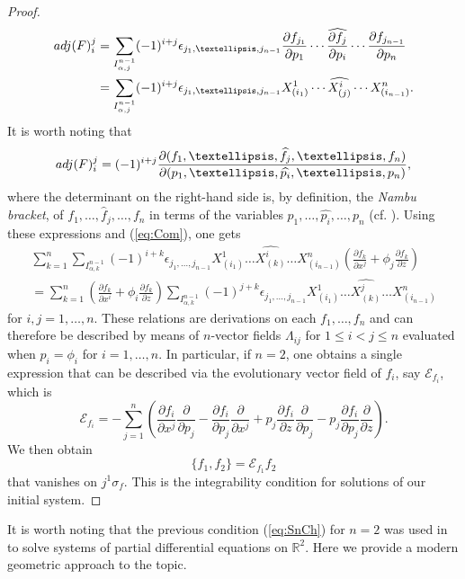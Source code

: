 \documentclass[12pt]{article}
\theoremstyle{plain}
\theoremstyle{definition}
\numberwithin{equation}{section}
\begin{document}
\begin{proof}
\begin{align*}
{\rm adj}(F)_{i}^j&=\sum_{I^{n-1}_{\alpha,j}}(-1)^{i+j}\epsilon_{j_1,\ldots,j_{n-1}}\frac{\partial f_{j_1}}{\partial p_{1}}\cdots\widehat{\frac{\partial f_{j}}{\partial p_{i}}}\cdots \frac{\partial f_{j_{n-1}}}{\partial p_{n}}
\\&=\sum_{I^{n-1}_{\alpha,j}}(-1)^{i+j}\epsilon_{j_1,\ldots,j_{n-1}}X^1_{({i_1})}\cdots\widehat{X^i_{({j})}}\cdots X^n_{(i_{n-1})}.
\end{align*}
It is worth noting that 
$$
{\rm adj}(F)_{i}^j=(-1)^{i+j}\frac{\partial(f_1,\ldots,\widehat{f}_j,\ldots ,f_n)}{\partial (p_1,\ldots,\widehat{p_i},\ldots,p_n)},
$$
where the determinant on the right-hand side is, by definition, the {\it Nambu bracket}, of $f_1,\ldots,\widehat{f}_j,\ldots,f_n$ in terms of the variables $p_1,\ldots,\widehat{p_i},\ldots,p_n$ (cf. \cite{Sh06}). 
Using these expressions and  (\ref{eq:Com}), one gets
\begin{multline*}
\sum_{k=1}^n\sum_{I^{n-1}_{\alpha,k}}(-1)^{i+k}\epsilon_{j_1,\ldots,j_{n-1}}X^{1}_{(i_1)}\ldots \widehat{X^{i}_{(k)}}\ldots X_{(i_{n-1})}^n\left(\frac{\partial f_k}{\partial x^j}+\phi_j\frac{\partial f_k}{\partial z}\right)\\=\sum_{k=1}^n
\left(\frac{\partial f_k}{\partial x^i}+\phi_i\frac{\partial f_k}{\partial z}\right)\sum_{I^{n-1}_{\alpha,k}}(-1)^{j+k}\epsilon_{j_1,\ldots,j_{n-1}}X^{1}_{(i_1)}\ldots \widehat{X^{j}_{(k)}}\ldots X_{(i_{n-1})}^n
\end{multline*}
for $i,j=1,\ldots,n$. These relations are derivations on each $f_1,\ldots,f_n$ and can therefore be described by means of  $n$-vector fields $\Lambda_{ij}$ for $1\leq i<j\leq n$ evaluated when $p_i=\phi_i$ for $i=1,\ldots,n$. In particular, if $n=2$, one obtains a single expression that can be described via the evolutionary vector field of $f_i$,  say $\mathcal{E}_{f_i}$, which is
$$
\mathcal{E}_{f_i}=-\sum_{j=1}^n\left(\frac{\partial f_i}{\partial x^j}\frac{\partial}{\partial p_j}-\frac{\partial f_i}{\partial p_j}\frac{\partial}{\partial x^j}+p_j\frac{\partial f_i}{\partial z}\frac{\partial}{\partial p_j}-p_j\frac{\partial f_i}{\partial p_j}\frac{\partial}{\partial z}\right).
$$
We then obtain
$$
\{f_1,f_2\}=\mathcal{E}_{f_1}f_2
$$
that vanishes on $j^1\sigma_f$. This is  the integrability condition for solutions of our initial system. 

\end{proof}

It is worth noting that the previous condition  (\ref{eq:SnCh}) for $n=2$ was used in \cite{Sn06} to solve systems of partial differential equations on $\mathbb{R}^2$. Here we provide a modern geometric approach to the topic. 
\end{document}
